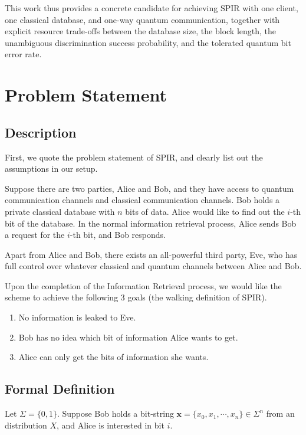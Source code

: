 \documentclass[%
 reprint,
superscriptaddress,
 amsmath,amssymb,
 aps,
]{revtex4-2}
\begin{document}
This work thus provides a concrete candidate for achieving SPIR with one client, one classical database, and one-way quantum communication, together with explicit resource trade-offs between the database size, the block length, the unambiguous discrimination success probability, and the tolerated quantum bit error rate.


\section{Problem Statement}
\subsection{Description}

First, we quote the problem statement of SPIR, and clearly list out the assumptions in our setup.

Suppose there are two parties, Alice and Bob, and they have access to quantum communication channels and classical communication channels. Bob holds a private classical database with $n$ bits of data. Alice would like to find out the $i$-th bit of the database. In the normal information retrieval process, Alice sends Bob a request for the $i$-th bit, and Bob responds. 

Apart from Alice and Bob, there exists an all-powerful third party, Eve, who has full control over whatever classical and quantum channels between Alice and Bob.

Upon the completion of the Information Retrieval process, we would like the scheme to achieve the following 3 goals (the walking definition of SPIR).

\begin{enumerate}
    \item No information is leaked to Eve.

    \item Bob has no idea which bit of information Alice wants to get.

    \item Alice can only get the bits of information she wants.
\end{enumerate}

\subsection{Formal Definition}
\label{sec:formal_definition}

Let $\Sigma=\{0, 1\}$. Suppose Bob holds a bit-string $\textbf{x}=\{x_0, x_1, \cdots, x_n\}\in\Sigma^n$ from an distribution $X$, and Alice is interested in bit $i$. 
\end{document}
